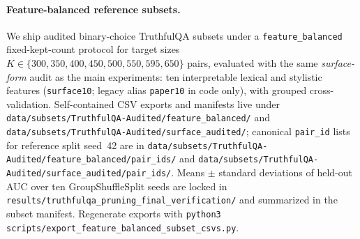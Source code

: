 
\paragraph{Feature-balanced reference subsets.}
We ship audited binary-choice TruthfulQA subsets under a \texttt{feature\_balanced} fixed-kept-count protocol for target sizes $K \in \{300,350,400,450,500,550,595,650\}$ pairs, evaluated with the same \emph{surface-form} audit as the main experiments: ten interpretable lexical and stylistic features (\texttt{surface10}; legacy alias \texttt{paper10} in code only), with grouped cross-validation.
Self-contained CSV exports and manifests live under \texttt{data/subsets/TruthfulQA-Audited/feature\_balanced/} and \texttt{data/subsets/TruthfulQA-Audited/surface\_audited/}; canonical \texttt{pair\_id} lists for reference split seed~42 are in \texttt{data/subsets/TruthfulQA-Audited/feature\_balanced/pair\_ids/} and \texttt{data/subsets/TruthfulQA-Audited/surface\_audited/pair\_ids/}.
Means $\pm$ standard deviations of held-out AUC over ten GroupShuffleSplit seeds are locked in \texttt{results/truthfulqa\_pruning\_final\_verification/} and summarized in the subset manifest.
Regenerate exports with \texttt{python3 scripts/export\_feature\_balanced\_subset\_csvs.py}.
